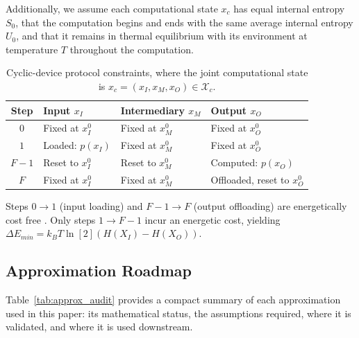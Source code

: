 \documentclass[12pt,onecolumn, margin=1in]{IEEEtran}
\begin{document}
Additionally, we assume each computational state $x_c$ has equal internal entropy $S_0$, that the computation begins and ends with the same average internal entropy $U_0$, and that it remains in thermal equilibrium with its environment at temperature $T$ throughout the computation.

\begin{table}[htbp]
\centering
\caption{Cyclic-device protocol constraints, where the joint computational state is $x_c = (x_I, x_M, x_O) \in \mathcal{X}_c$.}
\label{tab:cyclic_device}
\begin{tabular}{c l l l}
\toprule
\textbf{Step} & \textbf{Input $x_I$} & \textbf{Intermediary $x_M$} & \textbf{Output $x_O$} \\
\midrule
$0$ & Fixed at $x_I^0$ & Fixed at $x_M^0$ & Fixed at $x_O^0$ \\
$1$ & Loaded: $p(x_I)$ & Fixed at $x_M^0$ & Fixed at $x_O^0$ \\
$F{-}1$ & Reset to $x_I^0$ & Reset to $x_M^0$ & Computed: $p(x_O)$ \\
$F$ & Fixed at $x_I^0$ & Fixed at $x_M^0$ & Offloaded, reset to $x_O^0$ \\
\bottomrule
\end{tabular}
\vspace{4pt}

\noindent \footnotesize{Steps $0 \to 1$ (input loading) and $F{-}1 \to F$ (output offloading) are energetically cost free \cite[p. 34]{Wolpert2019}. Only steps $1 \to F{-}1$ incur an energetic cost, yielding $\Delta E_{min} = k_BT\ln[2](H(X_I) - H(X_O))$.}
\end{table}

\subsection{Approximation Roadmap}\label{app:approx_audit}

Table~\ref{tab:approx_audit} provides a compact summary of each approximation used in this paper: its mathematical status, the assumptions required, where it is validated, and where it is used downstream.
\end{document}
